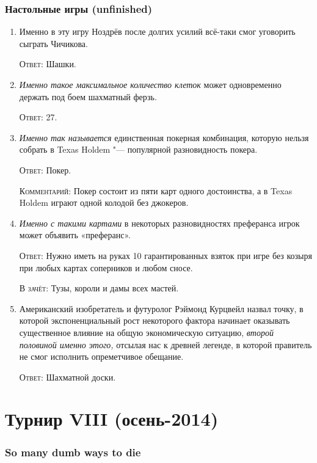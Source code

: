 \documentclass[a4paper,10pt]{article}
\let\keyword\textsc
\newenvironment{topic}{\begin{enumerate}}{\end{enumerate}}
\newcommand{\question}[3]{\item[#1.] #2 \par \keyword{Ответ:} #3}
\newcommand{\alternative}[1]{\par \keyword{В зачёт:} #1}
\newcommand{\commentary}[1]{\par \keyword{Комментарий:} #1}
\begin{document}
\section{Настольные игры (unfinished)}

\begin{topic}
 \question{10}{Именно в эту игру Ноздрёв после долгих усилий всё-таки смог уговорить сыграть Чичикова.}{Шашки.}
 \question{20}{\emph{Именно такое максимальное количество клеток} может одновременно держать под боем шахматный ферзь.}{27.}
 \question{30}{\emph{Именно так называется} единственная покерная комбинация, которую нельзя собрать в Texas Holdem "--- популярной разновидность покера.}{Покер.}\commentary{Покер состоит из пяти карт одного достоинства, а в Texas Holdem играют одной колодой без джокеров.}
 \question{40}{\emph{Именно с такими картами} в некоторых разновидностях преферанса игрок может объявить «преферанс».}{Нужно иметь на руках 10 гарантированных взяток при игре без козыря при любых картах соперников и любом сносе.}\alternative{Тузы, короли и дамы всех мастей.}
 \question{50}{Американский изобретатель и футуролог Рэймонд Курцвейл назвал точку, в которой экспоненциальный рост некоторого фактора начинает оказывать существенное влияние на общую экономическую ситуацию, \emph{второй половиной именно этого,} отсылая нас к древней легенде, в которой правитель не смог исполнить опреметчивое обещание.}{Шахматной доски.}
\end{topic}



\newpage
\part{Турнир VIII (осень-2014)}

\section{So many dumb ways to die}
\end{document}
